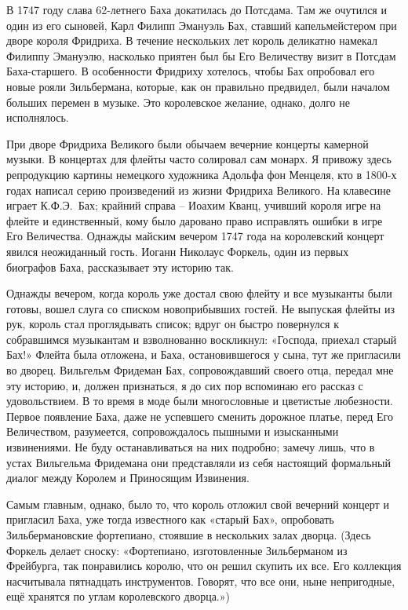 \documentclass[../main.tex]{subfiles}
\begin{document}
В 1747 году слава 62-летнего Баха докатилась до Потсдама. Там же очутился и один из его сыновей, Карл Филипп Эмануэль Бах, ставший капельмейстером при дворе короля Фридриха. В течение нескольких лет король деликатно намекал Филиппу Эмануэлю, насколько приятен был бы Его Величеству визит в Потсдам Баха-старшего. В особенности Фридриху хотелось, чтобы Бах опробовал его новые рояли Зильбермана, которые, как он правильно предвидел, были началом больших перемен в музыке. Это королевское желание, однако, долго не исполнялось.

При дворе Фридриха Великого были обычаем вечерние концерты камерной музыки. В концертах для флейты часто солировал сам монарх. Я привожу здесь репродукцию картины немецкого художника Адольфа фон Менцеля, кто в 1800-х годах написал серию произведений из жизни Фридриха Великого. На клавесине играет К.Ф.Э.~Бах; крайний справа \--- Иоахим Кванц, учивший короля игре на флейте и единственный, кому было даровано право исправлять ошибки в игре Его Величества. Однажды майским вечером 1747 года на королевский концерт явился неожиданный гость. Иоганн Николаус Форкель, один из первых биографов Баха, рассказывает эту историю так.

Однажды вечером, когда король уже достал свою флейту и все музыканты были готовы, вошел слуга со списком новоприбывших гостей. Не выпуская флейты из рук, король стал проглядывать список; вдруг он быстро повернулся к собравшимся музыкантам и взволнованно воскликнул: «Господа, приехал старый Бах!» Флейта была отложена, и Баха, остановившегося у сына, тут же пригласили во дворец. Вильгельм Фридеман Бах, сопровождавший своего отца, передал мне эту историю, и, должен признаться, я до сих пор вспоминаю его рассказ с удовольствием. В то время в моде были многословные и цветистые любезности. Первое появление Баха, даже не успевшего сменить дорожное платье, перед Его Величеством, разумеется, сопровождалось пышными и изысканными извинениями. Не буду останавливаться на них подробно; замечу лишь, что в устах Вильгельма Фридемана они представляли из себя настоящий формальный диалог между Королем и Приносящим Извинения.

Самым главным, однако, было то, что король отложил свой вечерний концерт и пригласил Баха, уже тогда известного как «старый Бах», опробовать Зильбермановские фортепиано, стоявшие в нескольких залах дворца. (Здесь Форкель делает сноску: «Фортепиано, изготовленные Зильберманом из Фрейбурга, так понравились королю, что он решил скупить их все. Его коллекция насчитывала пятнадцать инструментов. Говорят, что все они, ныне непригодные, ещё хранятся по углам королевского дворца.»)
\end{document}

